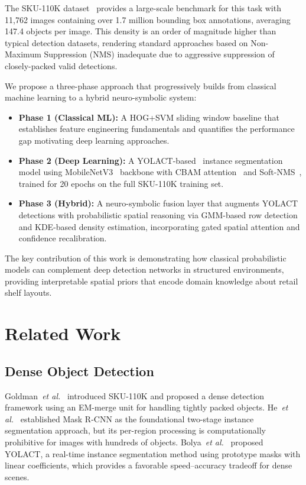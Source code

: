 \documentclass[conference]{IEEEtran}
\newcommand{\etal}{\emph{et al.}}
\begin{document}
The SKU-110K dataset~\cite{goldman2019sku110k} provides a large-scale benchmark
for this task with 11,762 images containing over 1.7 million bounding box
annotations, averaging 147.4 objects per image. This density is an order of
magnitude higher than typical detection datasets, rendering standard approaches
based on Non-Maximum Suppression (NMS) inadequate due to aggressive suppression
of closely-packed valid detections.

We propose a three-phase approach that progressively builds from classical
machine learning to a hybrid neuro-symbolic system:

\begin{itemize}
  \item \textbf{Phase 1 (Classical ML):} A HOG+SVM sliding window baseline
    that establishes feature engineering fundamentals and quantifies the
    performance gap motivating deep learning approaches.
  \item \textbf{Phase 2 (Deep Learning):} A YOLACT-based~\cite{bolya2019yolact}
    instance segmentation model using MobileNetV3~\cite{howard2019mobilenetv3}
    backbone with CBAM attention~\cite{woo2018cbam} and
    Soft-NMS~\cite{bodla2017softnms}, trained for 20 epochs on the full
    SKU-110K training set.
  \item \textbf{Phase 3 (Hybrid):} A neuro-symbolic fusion layer that augments
    YOLACT detections with probabilistic spatial reasoning via GMM-based row
    detection and KDE-based density estimation, incorporating gated spatial
    attention and confidence recalibration.
\end{itemize}

The key contribution of this work is demonstrating how classical probabilistic
models can complement deep detection networks in structured environments,
providing interpretable spatial priors that encode domain knowledge about retail
shelf layouts.

\section{Related Work}
\label{sec:related}

\subsection{Dense Object Detection}

Goldman~\etal~\cite{goldman2019sku110k} introduced SKU-110K and proposed a
dense detection framework using an EM-merge unit for handling tightly packed
objects. He~\etal~\cite{he2017maskrcnn} established Mask R-CNN as the
foundational two-stage instance segmentation approach, but its per-region
processing is computationally prohibitive for images with hundreds of objects.
Bolya~\etal~\cite{bolya2019yolact} proposed YOLACT, a real-time instance
segmentation method using prototype masks with linear coefficients, which
provides a favorable speed--accuracy tradeoff for dense scenes.
\end{document}
